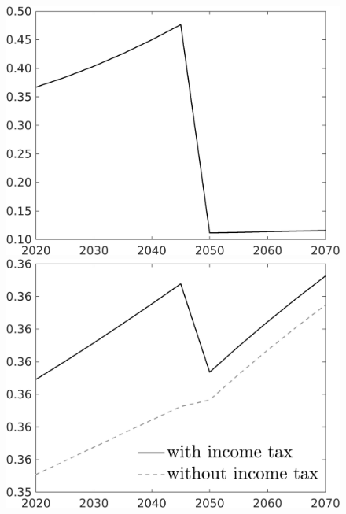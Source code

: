 \begin{figure}[h!!!]
\begin{minipage}[]{0.32\textwidth}
	\end{minipage}
\begin{minipage}[]{0.32\textwidth}
\includegraphics[width=1\textwidth]{../../codding_model/own_basedOnFried/optimalPol_010922_revision/figures/all_13Sept22_Tplus30/C_OPT_COMPtaulPer_regime4_spillover0_knspil1_noskill1_sep0_xgrowth0_PV1_etaa0.79.png}
\end{minipage}
	\begin{minipage}[]{0.32\textwidth}
		\includegraphics[width=1\textwidth]{../../codding_model/own_basedOnFried/optimalPol_010922_revision/figures/all_13Sept22_Tplus30/hh_OPT_COMPtaul_regime4_spillover0_knspil1_noskill1_sep0_xgrowth0_PV1_etaa0.79_lgd1.png}
	\end{minipage}


\end{figure}

